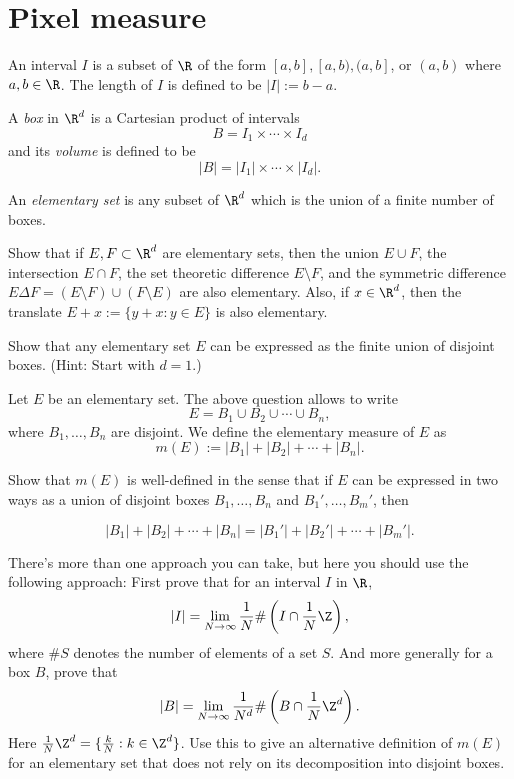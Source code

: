 \documentclass[lang=cn,11pt]{template}
\begin{document}
\newpage
\chapter{Pixel measure}

 An interval $I$ is a subset of $\R$ of the form $[a,b], [a,b), (a, b]$, or $(a,b)$ where $a, b \in \R$. The length of $I$ is defined to be $|I|:=b-a$. 

A \emph{box} in $\R^d$ is a Cartesian product of intervals $$B=I_1 \times \cdots \times I_d$$ and its \emph{volume} is defined to be $$|B|=|I_1|\times \cdots \times |I_d|.$$ 

An \emph{elementary set} is any subset of $\R^d$ which is the union of a finite number of boxes. 

 Show that if $E, F\subset \R^d$ are elementary sets, then the union $E\cup F$, the intersection $E\cap F$, the set theoretic difference $E\setminus F$, and the symmetric difference $E\Delta F=(E\setminus F)\cup (F\setminus E)$ are also elementary. Also, if $x\in \R^d$, then the translate $E+x:=\{y+x: y \in E\}$ is also elementary. 

 Show that any elementary set $E$ can be expressed as the finite union of disjoint boxes. (Hint: Start with $d=1$.)


 Let $E$ be an elementary set. The above question allows to write $$E=B_1 \cup B_2 \cup \cdots \cup B_n,$$ where $B_1, \ldots, B_n$ are disjoint. We define the elementary measure of $E$ as $$m(E):=|B_1|+|B_2|+\cdots+|B_n|.$$

 Show that $m(E)$ is well-defined in the sense that if $E$ can be expressed in two ways as a union of disjoint boxes $B_1, \ldots, B_n$ and $B_1', \ldots, B_m'$, then 
 
 $$|B_1|+|B_2|+\cdots+|B_n|=|B_1'|+|B_2'|+\cdots+|B_m'|.$$

There's more than one approach you can take, but here you should use the following approach: First prove that for an interval $I$ in $\R$,  
$$
|I|=\lim_{N\to \infty} \frac{1}{N}\# \left(I\cap \frac{1}{N} \Z\right),
$$
where $\#S$ denotes the number of elements of a set $S$. 
And more generally for a box $B$, prove that
$$
|B|=\lim_{N\to \infty} \frac{1}{N^d}\# \left(B\cap \frac{1}{N} \Z^d\right).
$$
Here $\frac{1}{N} \Z^d=\{\frac{k}{N}: k \in \Z^d\}$. Use this to give an alternative definition of $m(E)$ for an elementary set that does not rely on its decomposition into disjoint boxes.
\end{document}
